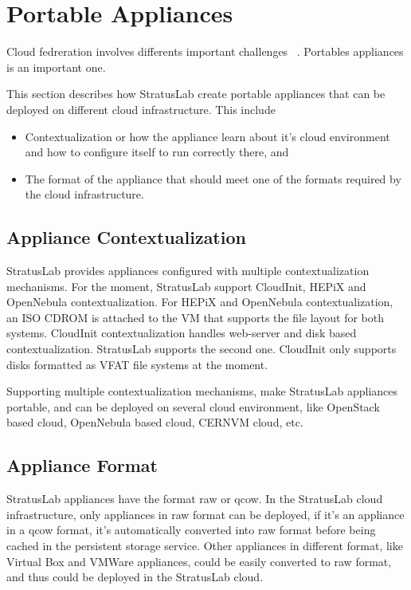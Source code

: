\section{Portable Appliances}
Cloud fedreration involves differents important challenges ~\cite{Petcu}. Portables appliances is an important one.

This section describes how StratusLab create portable appliances that can be deployed on different cloud infrastructure. This include 
\begin{itemize}
\item Contextualization or how the appliance learn about it's cloud environment and how to configure itself to run correctly there, and 
\item  The format of the appliance that should meet one of the formats required by the cloud infrastructure.
\end{itemize}
\subsection{Appliance Contextualization}
StratusLab provides appliances configured with multiple contextualization mechanisms. For the moment, StratusLab support CloudInit, HEPiX and OpenNebula contextualization.
For HEPiX and OpenNebula contextualization, an ISO CDROM is attached to the VM that supports the file layout for both systems.
CloudInit contextualization handles web-server and disk based contextualization. StratusLab supports the second one. CloudInit only supports disks formatted as VFAT file systems at the moment.

Supporting multiple contextualization mechanisms, make StratusLab appliances portable, and can be deployed on several cloud environment, like OpenStack based cloud, OpenNebula based cloud, CERNVM cloud, etc.

\subsection{Appliance Format}
StratusLab appliances have the format raw or qcow. In the StratusLab cloud infrastructure, only appliances in raw format can be deployed, if it's an appliance in a qcow format, it's automatically converted into raw format before being cached in the persistent storage service. Other appliances in different format, like Virtual Box and VMWare appliances, could be easily converted to raw format, and thus could be deployed in the StratusLab cloud.

